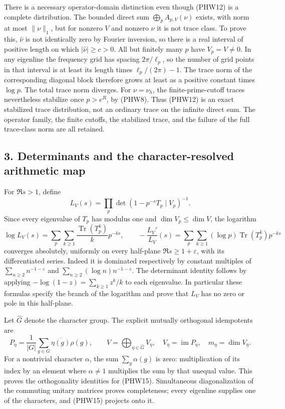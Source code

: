 \documentclass[
  10pt,
  a4paper,
]{article}
\begin{document}
There is a necessary operator-domain distinction even though (PHW12) is
a complete distribution. The bounded direct sum
\(\bigoplus_p A_{p,V}(\nu)\) exists, with norm at most \(\|\nu\|_1\),
but for nonzero \(V\) and nonzero \(\nu\) it is not trace class. To
prove this, \(\widehat\nu\) is not identically zero by Fourier
inversion, so there is a real interval of positive length on which
\(|\widehat\nu|\ge c>0\). All but finitely many \(p\) have
\(V_p=V\ne0\). In any eigenline the frequency grid has spacing
\(2\pi/\ell_p\), so the number of grid points in that interval is at
least its length times \(\ell_p/(2\pi)-1\). The trace norm of the
corresponding diagonal block therefore grows at least as a positive
constant times \(\log p\). The total trace norm diverges. For
\(\nu=\nu_h\), the finite-prime-cutoff traces nevertheless stabilize
once \(p>e^R\), by (PHW8). Thus (PHW12) is an exact stabilized trace
distribution, not an ordinary trace on the infinite direct sum. The
operator family, the finite cutoffs, the stabilized trace, and the
failure of the full trace-class norm are all retained.

\subsection{3. Determinants and the character-resolved arithmetic
map}\label{determinants-and-the-character-resolved-arithmetic-map}

For \(\Re s>1\), define \[
L_V(s)=\prod_p\det(1-p^{-s}T_p\mid V_p)^{-1}.
\tag{PHW13}
\] Since every eigenvalue of \(T_p\) has modulus one and
\(\dim V_p\le\dim V\), the logarithm \[
\log L_V(s)=\sum_p\sum_{k\ge1}\frac{\operatorname{Tr}(T_p^k)}k p^{-ks},
\qquad
-\frac{L_V'}{L_V}(s)=
\sum_p\sum_{k\ge1}(\log p)\operatorname{Tr}(T_p^k)p^{-ks}
\tag{PHW14}
\] converges absolutely, uniformly on every half-plane
\(\Re s\ge1+\varepsilon\), with its differentiated series. Indeed it is
dominated respectively by constant multiples of
\(\sum_{n\ge2}n^{-1-\varepsilon}\) and
\(\sum_{n\ge2}(\log n)n^{-1-\varepsilon}\). The determinant identity
follows by applying \(-\log(1-z)=\sum_{k\ge1}z^k/k\) to each eigenvalue.
In particular these formulas specify the branch of the logarithm and
prove that \(L_V\) has no zero or pole in this half-plane.

Let \(\widehat G\) denote the character group. The explicit mutually
orthogonal idempotents are \[
P_\eta=\frac1{|G|}\sum_{g\in G}\overline{\eta(g)}\rho(g),
\qquad V=\bigoplus_{\eta\in\widehat G}V_\eta,
\quad V_\eta=\operatorname{im}P_\eta,
\quad m_\eta=\dim V_\eta.
\tag{PHW15}
\] For a nontrivial character \(\alpha\), the sum \(\sum_g\alpha(g)\) is
zero: multiplication of its index by an element where \(\alpha\ne1\)
multiplies the sum by that unequal value. This proves the orthogonality
identities for (PHW15). Simultaneous diagonalization of the commuting
unitary matrices proves completeness; every eigenline supplies one of
the characters, and (PHW15) projects onto it.
\end{document}
